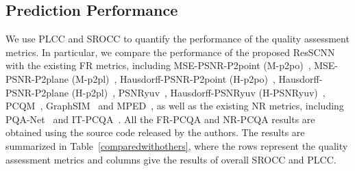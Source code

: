 \documentclass[acmsmall]{acmart}
\begin{document}
\subsection{Prediction Performance}\label{sec:LSexperiment}

\par We use PLCC and SROCC to quantify the performance of the quality assessment metrics. In particular, we compare the performance of the proposed ResSCNN with the existing FR metrics, including MSE-PSNR-P2point (M-p2po)~\cite{cignoni1998metro,MPEGSoft}, MSE-PSNR-P2plane (M-p2pl)~\cite{Mekuria2016Evaluation,MPEGSoft}, Hausdorff-PSNR-P2point (H-p2po)~\cite{cignoni1998metro,MPEGSoft}, Hausdorff-PSNR-P2plane (H-p2pl)~\cite{Mekuria2016Evaluation,MPEGSoft}, PSNRyuv~\cite{MPEGSoft}, Hausdorff-PSNRyuv (H-PSNRyuv)~\cite{MPEGSoft}, PCQM~\cite{meynet2020pcmd}, GraphSIM~\cite{yang2020graphsim} and MPED~\cite{yang2021MPED}, as well as  the existing NR metrics, including PQA-Net~\cite{Liu2021PQANet} and IT-PCQA~\cite{Yang2021ITPCQA}. All the FR-PCQA and NR-PCQA results are obtained using the source code released by the authors. The results are summarized in Table~\ref{comparedwithothers}, where the rows represent the quality assessment metrics and columns give the results of overall SROCC and PLCC.
\end{document}
